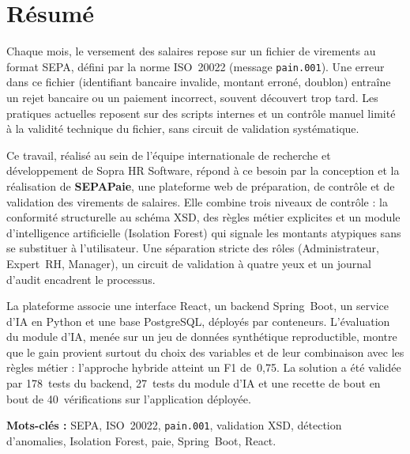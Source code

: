 \chapter*{Résumé}

Chaque mois, le versement des salaires repose sur un fichier de virements au format SEPA, défini par la norme ISO~20022 (message \texttt{pain.001}). Une erreur dans ce fichier (identifiant bancaire invalide, montant erroné, doublon) entraîne un rejet bancaire ou un paiement incorrect, souvent découvert trop tard. Les pratiques actuelles reposent sur des scripts internes et un contrôle manuel limité à la validité technique du fichier, sans circuit de validation systématique.

Ce travail, réalisé au sein de l'équipe internationale de recherche et développement de Sopra HR Software, répond à ce besoin par la conception et la réalisation de \textbf{SEPAPaie}, une plateforme web de préparation, de contrôle et de validation des virements de salaires. Elle combine trois niveaux de contrôle : la conformité structurelle au schéma XSD, des règles métier explicites et un module d'intelligence artificielle (Isolation Forest) qui signale les montants atypiques sans se substituer à l'utilisateur. Une séparation stricte des rôles (Administrateur, Expert~RH, Manager), un circuit de validation à quatre yeux et un journal d'audit encadrent le processus.

La plateforme associe une interface React, un backend Spring~Boot, un service d'IA en Python et une base PostgreSQL, déployés par conteneurs. L'évaluation du module d'IA, menée sur un jeu de données synthétique reproductible, montre que le gain provient surtout du choix des variables et de leur combinaison avec les règles métier : l'approche hybride atteint un F1 de~0,75. La solution a été validée par 178~tests du backend, 27~tests du module d'IA et une recette de bout en bout de 40~vérifications sur l'application déployée.

\vspace{0.4cm}
\noindent\textbf{Mots-clés :} SEPA, ISO~20022, \texttt{pain.001}, validation XSD, détection d'anomalies, Isolation Forest, paie, Spring~Boot, React.

\clearpage
